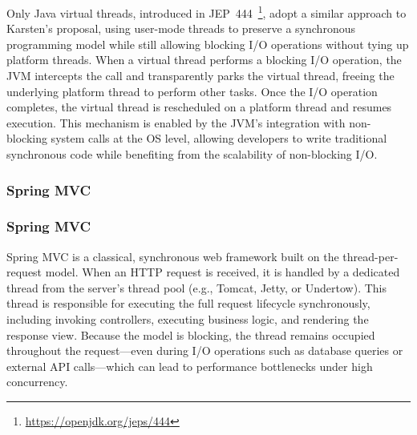 Only Java virtual threads, introduced in
JEP~444~\footnote{\url{https://openjdk.org/jeps/444}}, adopt a similar approach
to Karsten's proposal, using user-mode threads to preserve a synchronous
programming model while still allowing blocking I/O operations without tying up
platform threads. When a virtual thread performs a blocking I/O operation, the
JVM intercepts the call and transparently parks the virtual thread, freeing the
underlying platform thread to perform other tasks. Once the I/O operation
completes, the virtual thread is rescheduled on a platform thread and resumes
execution. This mechanism is enabled by the JVM's integration with non-blocking
system calls at the OS level, allowing developers to write traditional
synchronous code while benefiting from the scalability of non-blocking I/O.

\subsubsection{Spring MVC}

\subsubsection{Spring MVC}

Spring MVC is a classical, synchronous web framework built on the
thread-per-request model. When an HTTP request is received, it is handled by a
dedicated thread from the server’s thread pool (e.g., Tomcat, Jetty, or
Undertow). This thread is responsible for executing the full request lifecycle
synchronously, including invoking controllers, executing business logic, and
rendering the response view. Because the model is blocking, the thread remains
occupied throughout the request—even during I/O operations such as database
queries or external API calls—which can lead to performance bottlenecks under
high concurrency.

